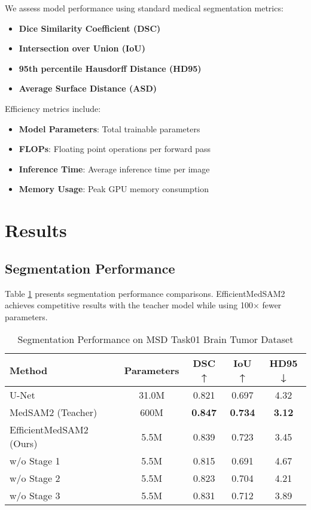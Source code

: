 \documentclass[conference]{IEEEtran}
\begin{document}
We assess model performance using standard medical segmentation metrics:
\begin{itemize}
    \item \textbf{Dice Similarity Coefficient (DSC)}
    \item \textbf{Intersection over Union (IoU)}
    \item \textbf{95th percentile Hausdorff Distance (HD95)}
    \item \textbf{Average Surface Distance (ASD)}
\end{itemize}

Efficiency metrics include:
\begin{itemize}
    \item \textbf{Model Parameters}: Total trainable parameters
    \item \textbf{FLOPs}: Floating point operations per forward pass
    \item \textbf{Inference Time}: Average inference time per image
    \item \textbf{Memory Usage}: Peak GPU memory consumption
\end{itemize}

\section{Results}

\subsection{Segmentation Performance}

Table \ref{tab:segmentation_results} presents segmentation performance comparisons. EfficientMedSAM2 achieves competitive results with the teacher model while using 100× fewer parameters.

\begin{table}[htbp]
\centering
\caption{Segmentation Performance on MSD Task01 Brain Tumor Dataset}
\label{tab:segmentation_results}
\begin{tabular}{@{}lcccc@{}}
\toprule
Method & Parameters & DSC ↑ & IoU ↑ & HD95 ↓ \\
\midrule
U-Net & 31.0M & 0.821 & 0.697 & 4.32 \\
MedSAM2 (Teacher) & 600M & \textbf{0.847} & \textbf{0.734} & \textbf{3.12} \\
EfficientMedSAM2 (Ours) & 5.5M & 0.839 & 0.723 & 3.45 \\
\midrule
w/o Stage 1 & 5.5M & 0.815 & 0.691 & 4.67 \\
w/o Stage 2 & 5.5M & 0.823 & 0.704 & 4.21 \\
w/o Stage 3 & 5.5M & 0.831 & 0.712 & 3.89 \\
\bottomrule
\end{tabular}
\end{table}
\end{document}
